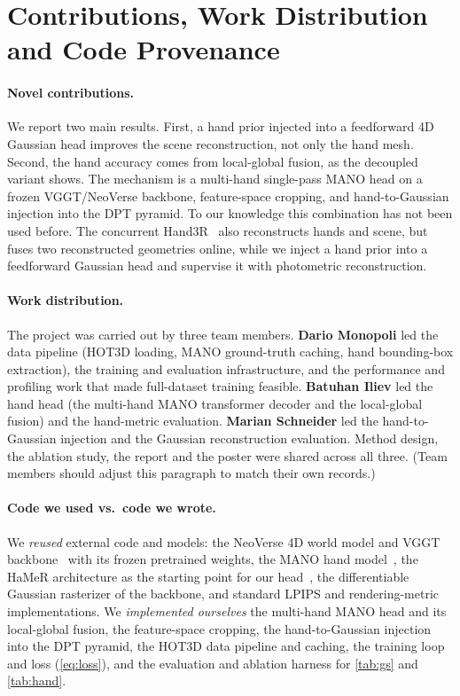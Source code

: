 \documentclass[10pt,twocolumn,letterpaper]{article}
\begin{document}
\section{Contributions, Work Distribution and Code Provenance}
\label{sec:contrib}

\paragraph{Novel contributions.}
We report two main results. First, a hand prior injected into a feedforward 4D
Gaussian head improves the scene reconstruction, not only the hand mesh. Second,
the hand accuracy comes from local-global fusion, as the decoupled variant shows.
The mechanism is a multi-hand single-pass MANO head on a frozen VGGT/NeoVerse
backbone, feature-space cropping, and hand-to-Gaussian injection into the DPT
pyramid. To our knowledge this combination has not been used before. The
concurrent Hand3R~\cite{hu2026hand3r} also reconstructs hands and
scene, but fuses two reconstructed geometries online, while we inject a hand prior
into a feedforward Gaussian head and supervise it with photometric reconstruction.

\paragraph{Work distribution.}
The project was carried out by three team members. \textbf{Dario Monopoli} led
the data pipeline (HOT3D loading, MANO ground-truth caching, hand bounding-box
extraction), the training and evaluation infrastructure, and the performance and
profiling work that made full-dataset training feasible. \textbf{Batuhan Iliev}
led the hand head (the multi-hand MANO transformer decoder and the local-global
fusion) and the hand-metric evaluation. \textbf{Marian Schneider} led the
hand-to-Gaussian injection and the Gaussian reconstruction evaluation. Method
design, the ablation study, the report and the
poster were shared across all three. (Team members should adjust this paragraph
to match their own records.)

\paragraph{Code we used vs.\ code we wrote.}
We \emph{reused} external code and models: the NeoVerse 4D world model and VGGT
backbone~\cite{yang2026neoverse,wang2025vggt} with its frozen pretrained weights,
the MANO hand model~\cite{romero2017mano}, the HaMeR architecture as the starting
point for our head~\cite{pavlakos2024hamer}, the differentiable Gaussian
rasterizer of the backbone, and standard LPIPS and rendering-metric
implementations. We \emph{implemented ourselves} the multi-hand MANO head and its
local-global fusion, the feature-space cropping, the hand-to-Gaussian injection
into the DPT pyramid, the HOT3D data pipeline and caching, the training loop and
loss (\cref{eq:loss}), and the evaluation and ablation harness for \cref{tab:gs}
and \cref{tab:hand}.
\end{document}
